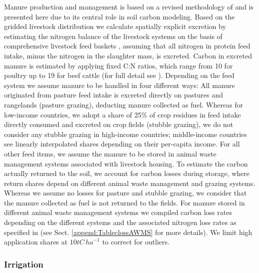 \documentclass[gc, manuscript]{copernicus}
\begin{document}
Manure production and management is based on a revised methodology of \citep{bodirsky_n2o_2012} and is presented here due to its central role in soil carbon modeling. Based on the gridded livestock distribution we calculate spatially explicit excretion by estimating the nitrogen balance of the livestock systems on the basis of comprehensive livestock feed baskets \citep{weindl_livestock_2017}, assuming that all nitrogen in protein feed intake, minus the nitrogen in the slaughter mass, is excreted. Carbon in excreted manure is estimated by applying fixed C:N ratios, which range from 10 for poultry up to 19 for beef cattle (for full detail see \citep{calvo_buendia_ipcc_2019}).
Depending on the feed system we assume manure to be handled in four different ways:
All manure originated from pasture feed intake is excreted directly on pastures and rangelands (pasture grazing), deducting manure collected as fuel.
Whereas for low-income countries, we adopt a share of 25\% of crop residues in feed intake directly consumed and excreted on crop fields (stubble grazing), we do not consider any stubble grazing in high-income countries; middle-income countries see linearly interpolated shares depending on their per-capita income.
For all other feed items, we assume the manure to be stored in animal waste management systems associated with livestock housing.
To estimate the carbon actually returned to the soil, we account for carbon losses during storage, where return shares depend on different animal waste management and grazing systems. Whereas we assume no losses for pasture and stubble grazing, we consider that the manure collected as fuel is not returned to the fields. For manure stored in different animal waste management systems we compiled carbon loss rates depending on the different systems and the associated nitrogen loss rates as specified in \citep{bodirsky_n2o_2012} (see Sect. \ref{append:TableclossAWMS} for more details). We limit high application shares at \(10\unit{tC\,ha}^{-1}\) to correct for outliers.

\hypertarget{sec:irrigation}{%
\subsubsection{Irrigation}\label{sec:irrigation}}
\end{document}
